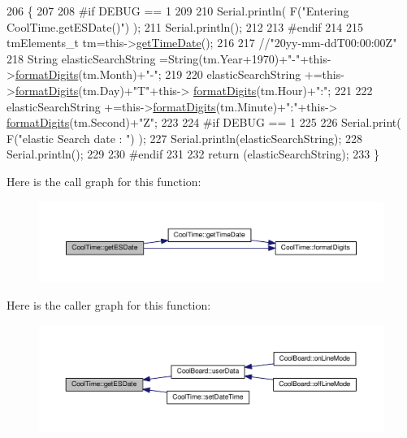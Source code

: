 \begin{DoxyCode}
206 \{
207 
208 \textcolor{preprocessor}{#if DEBUG == 1 }
209 
210     Serial.println( F(\textcolor{stringliteral}{"Entering CoolTime.getESDate()"}) );
211     Serial.println();
212 
213 \textcolor{preprocessor}{#endif }
214 
215     tmElements\_t tm=this->\hyperlink{class_cool_time_a7a7501c5ca77dd1248bea704c44f986c}{getTimeDate}();
216 
217     \textcolor{comment}{//"20yy-mm-ddT00:00:00Z"}
218     String elasticSearchString =String(tm.Year+1970)+\textcolor{stringliteral}{"-"}+this->\hyperlink{class_cool_time_acd537cd4210d7bde4e1f5c47d2ac0456}{formatDigits}(tm.Month)+\textcolor{stringliteral}{"-"};
219 
220     elasticSearchString +=this->\hyperlink{class_cool_time_acd537cd4210d7bde4e1f5c47d2ac0456}{formatDigits}(tm.Day)+\textcolor{stringliteral}{"T"}+this->
      \hyperlink{class_cool_time_acd537cd4210d7bde4e1f5c47d2ac0456}{formatDigits}(tm.Hour)+\textcolor{stringliteral}{":"};
221     
222     elasticSearchString +=this->\hyperlink{class_cool_time_acd537cd4210d7bde4e1f5c47d2ac0456}{formatDigits}(tm.Minute)+\textcolor{stringliteral}{":"}+this->
      \hyperlink{class_cool_time_acd537cd4210d7bde4e1f5c47d2ac0456}{formatDigits}(tm.Second)+\textcolor{stringliteral}{"Z"};
223 
224 \textcolor{preprocessor}{#if DEBUG == 1 }
225 
226     Serial.print( F(\textcolor{stringliteral}{"elastic Search date : "}) );
227     Serial.println(elasticSearchString);
228     Serial.println();
229 
230 \textcolor{preprocessor}{#endif}
231 
232     \textcolor{keywordflow}{return} (elasticSearchString);
233 \}
\end{DoxyCode}
Here is the call graph for this function\+:\nopagebreak
\begin{figure}[H]
\begin{center}
\leavevmode
\includegraphics[width=350pt]{d6/d49/class_cool_time_ac4f32ee513c1328d984306645e8785a4_cgraph}
\end{center}
\end{figure}
Here is the caller graph for this function\+:\nopagebreak
\begin{figure}[H]
\begin{center}
\leavevmode
\includegraphics[width=350pt]{d6/d49/class_cool_time_ac4f32ee513c1328d984306645e8785a4_icgraph}
\end{center}
\end{figure}
